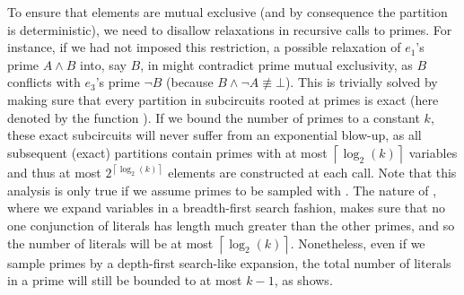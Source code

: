 To ensure that elements are mutual exclusive (and by consequence the partition is deterministic),
we need to disallow relaxations in recursive calls to primes. For instance, if we had not imposed
this restriction, a possible relaxation of $e_1$'s prime $A\wedge B$ into, say $B$, in
 might contradict prime mutual exclusivity, as $B$ conflicts with $e_3$'s prime
$\neg B$ (because $B\wedge\neg A\not\equiv\bot$). This is trivially solved by making sure that
every partition in subcircuits rooted at primes is exact (here denoted by the function
). If we bound the number of primes to a constant $k$, these exact
subcircuits will never suffer from an exponential blow-up, as all subsequent (exact) partitions
contain primes with at most $\left\lceil\log_2(k)\right\rceil$ variables and thus at most
$2^{\left\lceil\log_2(k)\right\rceil}$ elements are constructed at each call. Note that this
analysis is only true if we assume primes to be sampled with . The
nature of , where we expand variables in a breadth-first search
fashion, makes sure that no one conjunction of literals has length much greater than the other
primes, and so the number of literals will be at most $\left\lceil\log_2(k)\right\rceil$.
Nonetheless, even if we sample primes by a depth-first search-like expansion, the total number of
literals in a prime will still be bounded to at most $k-1$, as  shows.

